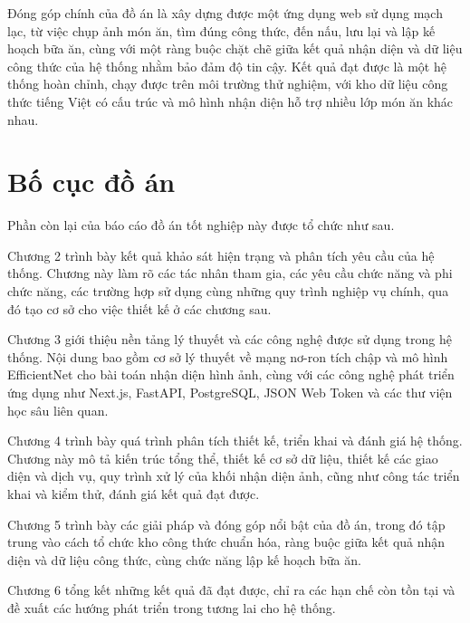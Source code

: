 \documentclass[../DoAn.tex]{subfiles}
\begin{document}
Đóng góp chính của đồ án là xây dựng được một ứng dụng web sử dụng mạch lạc, từ việc chụp ảnh món ăn, tìm đúng công thức, đến nấu, lưu lại và lập kế hoạch bữa ăn, cùng với một ràng buộc chặt chẽ giữa kết quả nhận diện và dữ liệu công thức của hệ thống nhằm bảo đảm độ tin cậy. Kết quả đạt được là một hệ thống hoàn chỉnh, chạy được trên môi trường thử nghiệm, với kho dữ liệu công thức tiếng Việt có cấu trúc và mô hình nhận diện hỗ trợ nhiều lớp món ăn khác nhau.

\section{Bố cục đồ án}
\label{section:1.4}
Phần còn lại của báo cáo đồ án tốt nghiệp này được tổ chức như sau.

Chương 2 trình bày kết quả khảo sát hiện trạng và phân tích yêu cầu của hệ thống. Chương này làm rõ các tác nhân tham gia, các yêu cầu chức năng và phi chức năng, các trường hợp sử dụng cùng những quy trình nghiệp vụ chính, qua đó tạo cơ sở cho việc thiết kế ở các chương sau.

Chương 3 giới thiệu nền tảng lý thuyết và các công nghệ được sử dụng trong hệ thống. Nội dung bao gồm cơ sở lý thuyết về mạng nơ-ron tích chập và mô hình EfficientNet cho bài toán nhận diện hình ảnh, cùng với các công nghệ phát triển ứng dụng như Next.js, FastAPI, PostgreSQL, JSON Web Token và các thư viện học sâu liên quan.

Chương 4 trình bày quá trình phân tích thiết kế, triển khai và đánh giá hệ thống. Chương này mô tả kiến trúc tổng thể, thiết kế cơ sở dữ liệu, thiết kế các giao diện và dịch vụ, quy trình xử lý của khối nhận diện ảnh, cũng như công tác triển khai và kiểm thử, đánh giá kết quả đạt được.

Chương 5 trình bày các giải pháp và đóng góp nổi bật của đồ án, trong đó tập trung vào cách tổ chức kho công thức chuẩn hóa, ràng buộc giữa kết quả nhận diện và dữ liệu công thức, cùng chức năng lập kế hoạch bữa ăn.

Chương 6 tổng kết những kết quả đã đạt được, chỉ ra các hạn chế còn tồn tại và đề xuất các hướng phát triển trong tương lai cho hệ thống.
\end{document}
